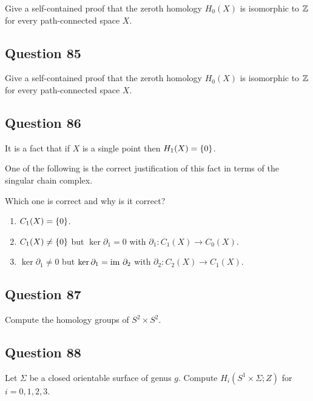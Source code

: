 \documentclass[12pt]{article}
\begin{document}
Give a self-contained proof that the zeroth homology \(H_0 (X)\) is
isomorphic to \({\mathbb{Z}}\) for every path-connected space \(X\).

\hypertarget{question-85-3}{%
\subsection{Question 85}\label{question-85-3}}

Give a self-contained proof that the zeroth homology \(H_0 (X)\) is
isomorphic to \({\mathbb{Z}}\) for every path-connected space \(X\).

\hypertarget{question-86-2}{%
\subsection{Question 86}\label{question-86-2}}

It is a fact that if \(X\) is a single point then
\(H_1 (X) = \left\{{0}\right\}\).

One of the following is the correct justification of this fact in terms
of the singular chain complex.

Which one is correct and why is it correct?

\begin{enumerate}
\def\labelenumi{\alph{enumi}.}
\item
  \(C_1 (X) = \left\{{0}\right\}\).
\item
  \(C_1 (X) \neq \left\{{0}\right\}\) but \(\ker \partial_1 = 0\) with
  \(\partial_1 : C_1 (X) \to C_0 (X)\).
\item
  \(\ker \partial_1 \neq 0\) but \(\ker \partial_1 = {\text{im}~}\partial_2\)
  with \(\partial_2 : C_2 (X) \to C_1 (X)\).
\end{enumerate}

\hypertarget{question-87-2}{%
\subsection{Question 87}\label{question-87-2}}

Compute the homology groups of \(S^2 \times S^2\).

\hypertarget{question-88-2}{%
\subsection{Question 88}\label{question-88-2}}

Let \(\Sigma\) be a closed orientable surface of genus \(g\). Compute
\(H_i(S^1 \times \Sigma; Z)\) for \(i = 0, 1, 2, 3\).
\end{document}
